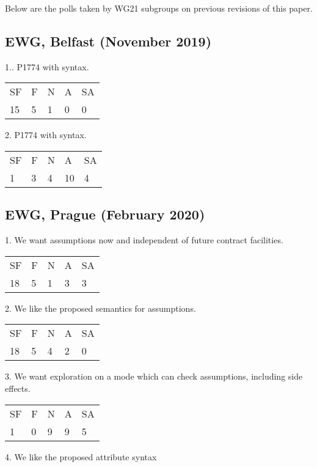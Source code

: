 Below are the polls taken by WG21 subgroups on previous revisions of this paper.


\subsection{EWG, Belfast (November 2019)}

1.. P1774 with  syntax.

\hspace{6mm}
\begin{tabular}{lllll}
SF & F & N & A & SA \\
15 & 5 & 1 & 0 & 0
\end{tabular}

2. P1774 with  syntax.

\hspace{6mm}
\begin{tabular}{lllll}
SF & F & N & A & SA \\
1 & 3 & 4 & 10 & 4
\end{tabular}

\subsection{EWG, Prague (February 2020)}

1. We want assumptions now and independent of future contract facilities.

\hspace{6mm}
\begin{tabular}{lllll}
SF & F & N & A & SA \\
18 & 5 & 1 & 3 & 3
\end{tabular}

2. We like the proposed semantics for assumptions.

\hspace{6mm}
\begin{tabular}{lllll}
SF & F & N & A & SA \\
18 & 5 & 4 & 2 & 0
\end{tabular}

3. We want exploration on a mode which can check assumptions, including side effects.

\hspace{6mm}
\begin{tabular}{lllll}
SF & F & N & A & SA \\
1 & 0 & 9 & 9 & 5
\end{tabular}

4. We like the proposed attribute syntax 

